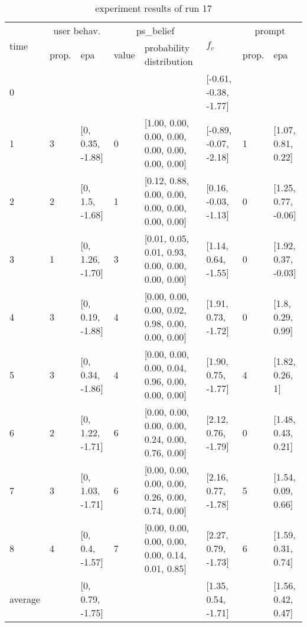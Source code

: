 \begin{table}[htbp]\footnotesize
\caption{experiment results of run 17}
\begin{center}
\begin{tabular}{|p{0.4cm}|p{0.6cm}|l|p{0.6cm}|p{3.3cm}|l|p{0.6cm}|l|}
\hline

\multirow{2}{*}{time} & \multicolumn{2}{c|}{user behav.} & \multicolumn{2}{c|}{ps\_belief} &
\multirow{2}{*}{$f_c$} & \multicolumn{2}{c|}{prompt} \\ \cline{2-5}\cline{ 7- 8}
& prop. & epa & value & probability distribution &  & prop. & epa \\ \hline

0 & \multicolumn{1}{l|}{} &  & \multicolumn{1}{l|}{} &  & [-0.61, -0.38, -1.77] & \multicolumn{1}{l|}{} &  \\ \hline
1 & 3 & [0, 0.35, -1.88] & 0 & [1.00, 0.00, 0.00, 0.00, 0.00, 0.00, 0.00, 0.00] & [-0.89, -0.07, -2.18] & 1 & [1.07, 0.81, 0.22] \\ \hline
2 & 2 & [0, 1.5, -1.68] & 1 & [0.12, 0.88, 0.00, 0.00, 0.00, 0.00, 0.00, 0.00] & [0.16, -0.03, -1.13] & 0 & [1.25, 0.77, -0.06] \\ \hline
3 & 1 & [0, 1.26, -1.70] & 3 & [0.01, 0.05, 0.01, 0.93, 0.00, 0.00, 0.00, 0.00] & [1.14, 0.64, -1.55] & 0 & [1.92, 0.37, -0.03] \\ \hline
4 & 3 & [0, 0.19, -1.88] & 4 & [0.00, 0.00, 0.00, 0.02, 0.98, 0.00, 0.00, 0.00] & [1.91, 0.73, -1.72] & 0 & [1.8, 0.29, 0.99] \\ \hline
5 & 3 & [0, 0.34, -1.86] & 4 & [0.00, 0.00, 0.00, 0.04, 0.96, 0.00, 0.00, 0.00] & [1.90, 0.75, -1.77] & 4 & [1.82, 0.26, 1] \\ \hline
6 & 2 & [0, 1.22, -1.71] & 6 & [0.00, 0.00, 0.00, 0.00, 0.24, 0.00, 0.76, 0.00] & [2.12, 0.76, -1.79] & 0 & [1.48, 0.43, 0.21] \\ \hline
7 & 3 & [0, 1.03, -1.71] & 6 & [0.00, 0.00, 0.00, 0.00, 0.26, 0.00, 0.74, 0.00] & [2.16, 0.77, -1.78] & 5 & [1.54, 0.09, 0.66] \\ \hline
8 & 4 & [0, 0.4, -1.57] & 7 & [0.00, 0.00, 0.00, 0.00, 0.00, 0.14, 0.01, 0.85] & [2.27, 0.79, -1.73] & 6 & [1.59, 0.31, 0.74] \\ \hline
\multicolumn{1}{|l|}{average} & \multicolumn{1}{l|}{} & [0, 0.79, -1.75] & \multicolumn{1}{l|}{} &  & [1.35, 0.54, -1.71] & \multicolumn{1}{l|}{} & [1.56, 0.42, 0.47] \\ \hline
\end{tabular}
\end{center}
\label{}
\end{table}



